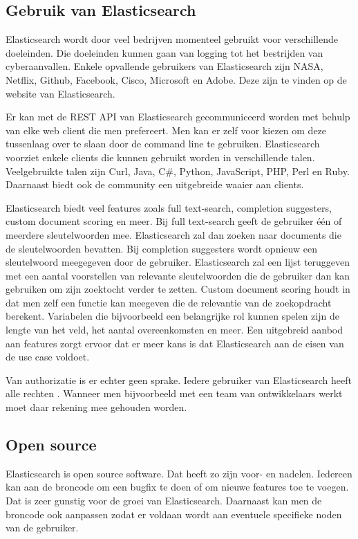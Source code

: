\subsection{Gebruik van Elasticsearch}
\label{subsec:gebruikES}

Elasticsearch wordt door veel bedrijven momenteel gebruikt voor verschillende doeleinden. Die doeleinden kunnen gaan van logging tot het bestrijden van cyberaanvallen. Enkele opvallende gebruikers van Elasticsearch zijn NASA, Netflix, Github, Facebook, Cisco, Microsoft en Adobe. Deze zijn te vinden op de website van Elasticsearch.

Er kan met de REST API van Elasticsearch gecommuniceerd worden met behulp van elke web client die men prefereert. Men kan er zelf voor kiezen om deze tussenlaag over te slaan door de command line te gebruiken. Elasticsearch voorziet enkele clients die kunnen gebruikt worden in verschillende talen. Veelgebruikte talen zijn Curl, Java, C\#, Python, JavaScript, PHP, Perl en Ruby. Daarnaast biedt ook de community een uitgebreide waaier aan clients.

Elasticsearch biedt veel features zoals full text-search, completion suggesters, custom document scoring en meer. Bij full text-search geeft de gebruiker één of meerdere sleutelwoorden mee. Elasticsearch zal dan zoeken naar documents die de sleutelwoorden bevatten. Bij completion suggesters wordt opnieuw een sleutelwoord meegegeven door de gebruiker. Elasticsearch zal een lijst teruggeven met een aantal voorstellen van relevante sleutelwoorden die de gebruiker dan kan gebruiken om zijn zoektocht verder te zetten. Custom document scoring houdt in dat men zelf een functie kan meegeven die de relevantie van de zoekopdracht berekent. Variabelen die bijvoorbeeld een belangrijke rol kunnen spelen zijn de lengte van het veld, het aantal overeenkomsten en meer. Een uitgebreid aanbod aan features zorgt ervoor dat er meer kans is dat Elasticsearch aan de eisen van de use case voldoet. 

Van authorizatie is er echter geen sprake. Iedere gebruiker van Elasticsearch heeft alle rechten \autocite{Brasetvik2013}. Wanneer men bijvoorbeeld met een team van ontwikkelaars werkt moet daar rekening mee gehouden worden.

\subsection{Open source}

Elasticsearch is open source software. Dat heeft zo zijn voor- en nadelen. Iedereen kan aan de broncode om een bugfix te doen of om nieuwe features toe te voegen. Dat is zeer gunstig voor de groei van Elasticsearch. Daarnaast kan men de broncode ook aanpassen zodat er voldaan wordt aan eventuele specifieke noden van de gebruiker. \autocite{Tahir2008}

